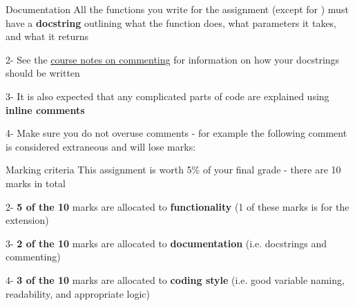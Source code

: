 \documentclass[week3]{csse1001}
\begin{document}
\begin{topic}{Documentation}
All the functions you write for the assignment (except for ) must have a \textbf{docstring} outlining what the function does, what parameters it takes, and what it returns

\begin{subtopic}{2-}
See the \href{http://csse1001.uqcloud.net/notes/commenting}{course notes on commenting} for information on how your docstrings should be written
\end{subtopic}

\begin{subtopic}{3-}
It is also expected that any complicated parts of code are explained using \textbf{inline comments}
\end{subtopic}

\begin{subtopic}{4-}
Make sure you do not overuse comments - for example the following comment is considered extraneous and will lose marks:\\
\end{subtopic}

\end{topic}

\begin{topic}{Marking criteria}
This assignment is worth 5\% of your final grade - there are 10 marks in total

\begin{subtopic}{2-}
\textbf{5 of the 10} marks are allocated to \textbf{functionality} (1 of these marks is for the extension)
\end{subtopic}

\begin{subtopic}{3-}
\textbf{2 of the 10} marks are allocated to \textbf{documentation} (i.e. docstrings and commenting)
\end{subtopic}

\begin{subtopic}{4-}
\textbf{3 of the 10} marks are allocated to \textbf{coding style} (i.e. good variable naming, readability, and appropriate logic)
\end{subtopic}

\end{topic}
\end{document}
